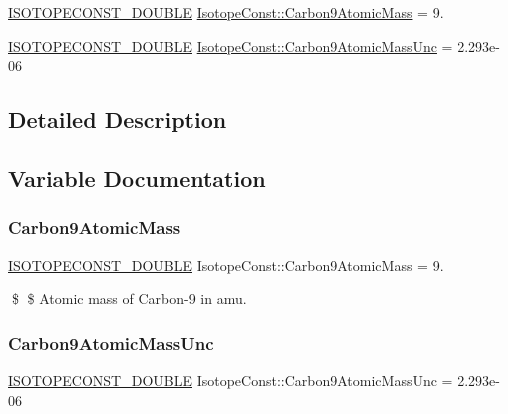 \begin{DoxyCompactItemize}
\item 
\mbox{\hyperlink{group___isotope_const-_macros_ga8f45a7272ce02c0b4c65c44636ed719a}{I\+S\+O\+T\+O\+P\+E\+C\+O\+N\+S\+T\+\_\+\+D\+O\+U\+B\+LE}} \mbox{\hyperlink{group___isotope_const-_carbon-_c9_gaa7202d2c4203cda437d3a7d2022d0c04}{Isotope\+Const\+::\+Carbon9\+Atomic\+Mass}} = 9.
\item 
\mbox{\hyperlink{group___isotope_const-_macros_ga8f45a7272ce02c0b4c65c44636ed719a}{I\+S\+O\+T\+O\+P\+E\+C\+O\+N\+S\+T\+\_\+\+D\+O\+U\+B\+LE}} \mbox{\hyperlink{group___isotope_const-_carbon-_c9_ga458e88b636dc099d037d43d55eb0c094}{Isotope\+Const\+::\+Carbon9\+Atomic\+Mass\+Unc}} = 2.\+293e-\/06
\end{DoxyCompactItemize}


\subsection{Detailed Description}


\subsection{Variable Documentation}
\mbox{\label{group___isotope_const-_carbon-_c9_gaa7202d2c4203cda437d3a7d2022d0c04}} 
\subsubsection{\texorpdfstring{Carbon9\+Atomic\+Mass}{Carbon9AtomicMass}}
{\footnotesize\ttfamily \mbox{\hyperlink{group___isotope_const-_macros_ga8f45a7272ce02c0b4c65c44636ed719a}{I\+S\+O\+T\+O\+P\+E\+C\+O\+N\+S\+T\+\_\+\+D\+O\+U\+B\+LE}} Isotope\+Const\+::\+Carbon9\+Atomic\+Mass = 9.}

\$ \$ Atomic mass of Carbon-\/9 in amu. \mbox{\label{group___isotope_const-_carbon-_c9_ga458e88b636dc099d037d43d55eb0c094}} 
\subsubsection{\texorpdfstring{Carbon9\+Atomic\+Mass\+Unc}{Carbon9AtomicMassUnc}}
{\footnotesize\ttfamily \mbox{\hyperlink{group___isotope_const-_macros_ga8f45a7272ce02c0b4c65c44636ed719a}{I\+S\+O\+T\+O\+P\+E\+C\+O\+N\+S\+T\+\_\+\+D\+O\+U\+B\+LE}} Isotope\+Const\+::\+Carbon9\+Atomic\+Mass\+Unc = 2.\+293e-\/06}

